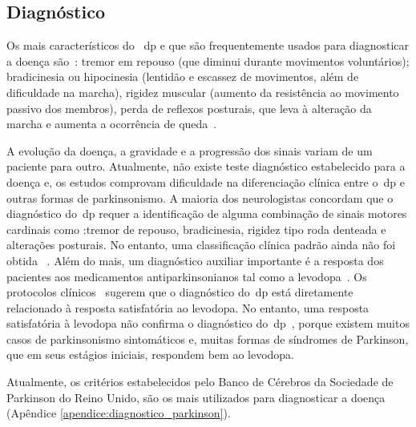 \subsection{Diagnóstico}
Os mais característicos do ~\ac{dp} e que são frequentemente usados para diagnosticar a doença são~\cite{rowlandtratado}: tremor em repouso (que diminui durante movimentos voluntários); bradicinesia ou hipocinesia (lentidão e escassez de movimentos, além de dificuldade na marcha), rigidez muscular (aumento da resistência ao movimento passivo dos membros), perda de reflexos posturais, que leva à alteração da marcha e aumenta a ocorrência de queda~\cite{rodrigues2006,tolosa06}. 

A evolução da doença, a gravidade e a progressão dos sinais variam de um paciente para outro. Atualmente, não existe teste diagnóstico estabelecido para a doença e, os estudos comprovam dificuldade na diferenciação clínica entre o~\ac{dp} e outras formas de parkinsonismo. A maioria dos neurologistas concordam que o diagnóstico do~\ac{dp} requer a identificação de alguma combinação de sinais motores cardinais como :tremor de repouso, bradicinesia, rigidez tipo roda denteada e alterações posturais. No entanto, uma classificação clínica padrão ainda não foi obtida ~\cite{protpar010}. Além do mais, um diagnóstico auxiliar importante é a resposta dos pacientes aos medicamentos antiparkinsonianos tal como a levodopa~\cite{protpar010}. Os protocolos clínicos~\cite{protpar010,national2006parkinson} sugerem que o diagnóstico do~\ac{dp} está diretamente relacionado à resposta satisfatória ao levodopa. No entanto, uma resposta satisfatória à levodopa não confirma o diagnóstico do~\ac{dp}~\cite{rowlandtratado}, porque existem muitos casos de parkinsonismo sintomáticos e, muitas formas de síndromes de Parkinson, que em seus estágios iniciais, respondem bem ao levodopa. 

Atualmente, os critérios estabelecidos pelo Banco de Cérebros da Sociedade de Parkinson do Reino Unido, são os mais utilizados para diagnosticar a doença~\cite{protpar010} (Apêndice \ref{apendice:diagnostico_parkinson}). 



